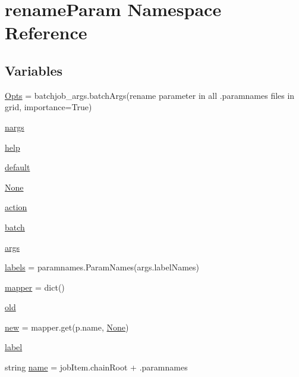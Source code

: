 \hypertarget{namespacerenameParam}{}\section{rename\+Param Namespace Reference}
\label{namespacerenameParam}
\subsection*{Variables}
\begin{DoxyCompactItemize}
\item 
\mbox{\hyperlink{namespacerenameParam_aecad79c1e5ebda47e34455d67eff274f}{Opts}} = batchjob\+\_\+args.\+batch\+Args(\textquotesingle{}rename parameter in all .paramnames files in grid\textquotesingle{}, importance=True)
\item 
\mbox{\hyperlink{namespacerenameParam_a13bc97f266bfb86ab4041205b0886396}{nargs}}
\item 
\mbox{\hyperlink{namespacerenameParam_a5acadbb13704540370cc0b52dac2d618}{help}}
\item 
\mbox{\hyperlink{namespacerenameParam_a822d47573be2160a206997ccc8cce5b5}{default}}
\item 
\mbox{\hyperlink{namespacerenameParam_afe927de0e02c7767f643ec6c1d857c67}{None}}
\item 
\mbox{\hyperlink{namespacerenameParam_a5ca1595c439d776ab386e616b1b572ac}{action}}
\item 
\mbox{\hyperlink{namespacerenameParam_a9378aa3789f3d37f560a0ecd4ee1d6a0}{batch}}
\item 
\mbox{\hyperlink{namespacerenameParam_ab229a9f7d112b643eb41437e43fd595e}{args}}
\item 
\mbox{\hyperlink{namespacerenameParam_a14048116c746f90200dccf659ca89146}{labels}} = paramnames.\+Param\+Names(args.\+label\+Names)
\item 
\mbox{\hyperlink{namespacerenameParam_ac963cf6f6a5501113ebadbeb3d18ca28}{mapper}} = dict()
\item 
\mbox{\hyperlink{namespacerenameParam_abf75c58da9b3087533cb03ba79355a98}{old}}
\item 
\mbox{\hyperlink{namespacerenameParam_a83cec360a0629f304de2e61e28fec758}{new}} = mapper.\+get(p.\+name, \mbox{\hyperlink{namespacerenameParam_afe927de0e02c7767f643ec6c1d857c67}{None}})
\item 
\mbox{\hyperlink{namespacerenameParam_a81fae02f7e362403102775db2ee01806}{label}}
\item 
string \mbox{\hyperlink{namespacerenameParam_acc5239392b836c3740beccfcf6245fc6}{name}} = job\+Item.\+chain\+Root + \textquotesingle{}.paramnames\textquotesingle{}

\end{DoxyCompactItemize}

